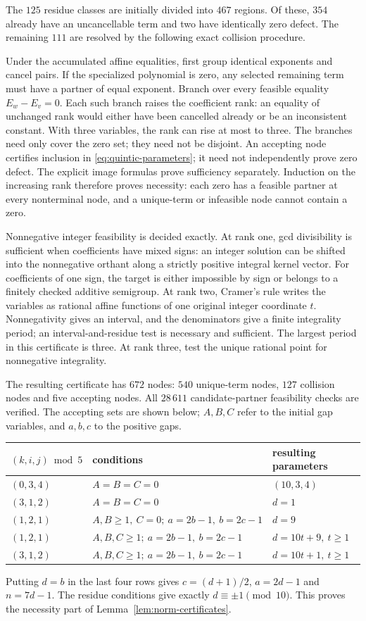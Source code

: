 \documentclass[11pt]{article}
\theoremstyle{definition}
\theoremstyle{remark}
\begin{document}
The $125$ residue classes are initially divided into $467$ regions.
Of these, $354$ already have an uncancellable term and two have
identically zero defect. The remaining $111$ are resolved by the
following exact collision procedure.

Under the accumulated affine equalities, first group identical
exponents and cancel pairs. If the specialized polynomial is zero,
any selected remaining term must have a partner of equal exponent.
Branch over every feasible equality $E_w-E_v=0$. Each such branch
raises the coefficient rank: an equality of unchanged rank would
either have been cancelled already or be an inconsistent constant.
With three variables, the rank can rise at most to three.
The branches need only cover the zero set; they need not be disjoint.
An accepting node certifies inclusion in \eqref{eq:quintic-parameters};
it need not independently prove zero defect.
The explicit image formulas prove sufficiency separately.
Induction on the increasing rank therefore proves necessity:
each zero has a feasible partner at every nonterminal node,
and a unique-term or infeasible node cannot contain a zero.

Nonnegative integer feasibility is decided exactly.
At rank one, gcd divisibility is sufficient when coefficients have
mixed signs: an integer solution can be shifted into the nonnegative
orthant along a strictly positive integral kernel vector.
For coefficients of one sign, the target is either impossible by
sign or belongs to a finitely checked additive semigroup.
At rank two, Cramer's rule writes the variables as rational affine
functions of one original integer coordinate $t$.
Nonnegativity gives an interval, and the denominators give a finite
integrality period; an interval-and-residue test is necessary and
sufficient. The largest period in this certificate is three.
At rank three, test the unique rational point for nonnegative
integrality.

The resulting certificate has $672$ nodes: $540$ unique-term
nodes, $127$ collision nodes and five accepting nodes.
All $28\,611$ candidate-partner feasibility checks are verified.
The accepting sets are shown below; $A,B,C$ refer to the initial
gap variables, and $a,b,c$ to the positive gaps.
\begin{center}\small
\begin{tabular}{lll}
\toprule
$(k,i,j)\bmod5$ & conditions & resulting parameters\\
\midrule
$(0,3,4)$ & $A=B=C=0$ & $(10,3,4)$\\
$(3,1,2)$ & $A=B=C=0$ & $d=1$\\
$(1,2,1)$ & $A,B\ge1,\ C=0;\ a=2b-1,\ b=2c-1$ & $d=9$\\
$(1,2,1)$ & $A,B,C\ge1;\ a=2b-1,\ b=2c-1$ & $d=10t+9,\ t\ge1$\\
$(3,1,2)$ & $A,B,C\ge1;\ a=2b-1,\ b=2c-1$ & $d=10t+1,\ t\ge1$\\
\bottomrule
\end{tabular}
\end{center}
Putting $d=b$ in the last four rows gives
$c=(d+1)/2$, $a=2d-1$ and $n=7d-1$.
The residue conditions give exactly $d\equiv\pm1\pmod {10}$.
This proves the necessity part of Lemma~\ref{lem:norm-certificates}.
\end{document}
